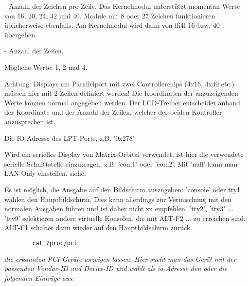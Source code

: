\begin{description}
   - Anzahl der Zeichen pro Zeile.
  Das Kernelmodul unterstützt momentan Werte von 16, 20, 24, 32 und
  40. Module mit 8 oder 27 Zeichen funktionieren üblicherweise ebenfalls.
  Am Kernelmodul wird dann von fli4l 16 bzw. 40 übergeben.

 - Anzahl der Zeilen. 

    Mögliche Werte: 1, 2 und 4.
    
    Achtung: Displays am Parallelport mit zwei Controllerchips (4x16,
    4x40 etc.)  müssen hier mit 2 Zeilen definiert werden! Die
    Koordinaten der anzuzeigenden Werte können normal angegeben
    werden. Der LCD-Treiber entscheidet anhand der Koordinate und der
    Anzahl der Zeilen, welcher der beiden Kontroller anzusprechen ist.


      Die IO-Adresse des LPT-Ports, z.B. '0x278'
      
      Wird ein serielles Display von Matrix-Orbital verwendet, ist
      hier die verwendete serielle Schnittstelle einzutragen, z.B.
      'com1' oder 'com2'. Mit 'null' kann man LAN-Only einstellen, siehe: 
      
      Es ist möglich, die Ausgabe auf den Bildschirm auszugeben:
      'console' oder tty1 wählen den Hauptbildschirm. Dies kann allerdings
      zur Vermischung mit den normalen Ausgaben führen und ist daher nicht
      zu empfehlen. 'tty2', 'tty3' ... 'tty9' selektieren andere virtuelle 
      Konsolen, die mit ALT-F2 ... zu erreichen sind. ALT-F1 schaltet dann
      wieder auf den Hauptbildschirm zurück.


\begin{example}
\begin{verbatim}
        cat /proc/pci
\end{verbatim}
\end{example}

        \emph{die erkannten PCI-Geräte anzeigen lassen. Hier sucht man das Gerät mit
        der passenden Vendor-ID und Device-ID und wählt als io-Adresse den oder
        die folgenden Einträge aus:}


\end{description}
